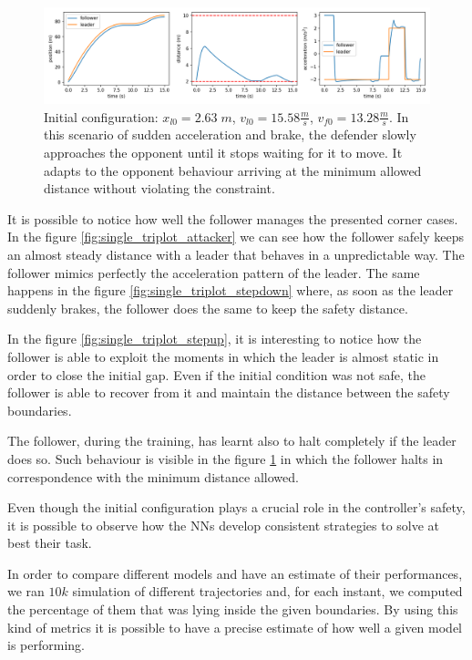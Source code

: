\begin{figure}[H]
	\centering
	\includegraphics[width=13.8cm, keepaspectratio]{img/5_3_triplot_pulse.png}
	\caption{Initial configuration: $x_{l0}=2.63 \; m$, $v_{l0}=15.58 \frac{m}{s}$, $v_{f0}=13.28 \frac{m}{s}$. In this scenario of sudden acceleration and brake, the defender slowly approaches the opponent until it stops waiting for it to move. It adapts to the opponent behaviour arriving at the minimum allowed distance without violating the constraint.}
    \label{fig:single_triplot_pulse}
\end{figure}

It is possible to notice how well the follower manages the presented corner cases.
In the figure \ref{fig:single_triplot_attacker} we can see how the follower safely keeps an almost steady distance with a leader that behaves in a unpredictable way.
The follower mimics perfectly the acceleration pattern of the leader.
The same happens in the figure \ref{fig:single_triplot_stepdown} where, as soon as the leader suddenly brakes, the follower does the same to keep the safety distance.

In the figure \ref{fig:single_triplot_stepup}, it is interesting to notice how the follower is able to exploit the moments in which the leader is almost static in order to close the initial gap.
Even if the initial condition was not safe, the follower is able to recover from it and maintain the distance between the safety boundaries.

The follower, during the training, has learnt also to halt completely if the leader does so.
Such behaviour is visible in the figure \ref{fig:single_triplot_pulse} in which the follower halts in correspondence with the minimum distance allowed.

Even though the initial configuration plays a crucial role in the controller's safety, it is possible to observe how the NNs develop consistent strategies to solve at best their task.

In order to compare different models and have an estimate of their performances, we ran $10k$ simulation of different trajectories and, for each instant, we computed the percentage of them that was lying inside the given boundaries.
By using this kind of metrics it is possible to have a precise estimate of how well a given model is performing.

